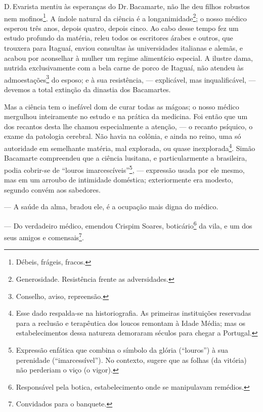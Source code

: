 D.\,Evarista mentiu às esperanças do Dr.\,Bacamarte, não lhe deu filhos
robustos nem mofinos\footnote{Débeis, frágeis, fracos.}. A índole
natural da ciência é a longanimidade\footnote{Generosidade. Resistência
  frente as adversidades.}; o nosso médico esperou três anos, depois
quatro, depois cinco. Ao cabo desse tempo fez um estudo profundo da
matéria, releu todos os escritores árabes e outros, que trouxera para
Itaguaí, enviou consultas às universidades italianas e alemãs, e acabou
por aconselhar à mulher um regime alimentício especial. A ilustre dama,
nutrida exclusivamente com a bela carne de porco de Itaguaí, não atendeu
às admoestações\footnote{Conselho, aviso, repreensão.} do esposo; e à
sua resistência, --- explicável, mas inqualificável, --- devemos a total
extinção da dinastia dos Bacamartes.

Mas a ciência tem o inefável dom de curar todas as mágoas; o nosso
médico mergulhou inteiramente no estudo e na prática da medicina. Foi
então que um dos recantos desta lhe chamou especialmente a atenção, ---
o recanto psíquico, o exame da patologia cerebral. Não havia na colônia,
e ainda no reino, uma só autoridade em semelhante matéria, mal
explorada, ou quase inexplorada\footnote{Esse dado respalda-se na
  historiografia. As primeiras instituições reservadas para a reclusão e
  terapêutica dos loucos remontam à Idade Média; mas os estabelecimentos
  dessa natureza demoraram séculos para chegar a Portugal.}. Simão
Bacamarte compreendeu que a ciência lusitana, e particularmente a
brasileira, podia cobrir-se de ``louros imarcescíveis''\footnote{Expressão
  enfática que combina o símbolo da glória (``louros'') à sua perenidade
  (``imarcessível''). No contexto, sugere que as folhas (da vitória) não
  perderiam o viço (o vigor).}, --- expressão usada por ele mesmo, mas
em um arroubo de intimidade doméstica; exteriormente era modesto,
segundo convém aos sabedores.

--- A saúde da alma, bradou ele, é a ocupação mais digna do médico.

--- Do verdadeiro médico, emendou Crispim Soares, boticário\footnote{Responsável
  pela botica, estabelecimento onde se manipulavam remédios.} da vila, e
um dos seus amigos e comensais\footnote{Convidados para o banquete.}.

